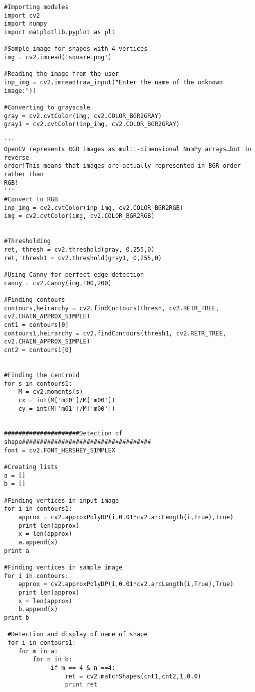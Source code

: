 \documentclass[]{article}
\begin{document}
\begin{verbatim}
#Importing modules
import cv2 
import numpy
import matplotlib.pyplot as plt

#Sample image for shapes with 4 vertices
img = cv2.imread('square.png')

#Reading the image from the user
inp_img = cv2.imread(raw_input("Enter the name of the unknown image:"))

#Converting to grayscale
gray = cv2.cvtColor(img, cv2.COLOR_BGR2GRAY)
gray1 = cv2.cvtColor(inp_img, cv2.COLOR_BGR2GRAY)

'''
OpenCV represents RGB images as multi-dimensional NumPy arrays…but in reverse
order!This means that images are actually represented in BGR order rather than
RGB!
'''
#Convert to RGB
inp_img = cv2.cvtColor(inp_img, cv2.COLOR_BGR2RGB)
img = cv2.cvtColor(img, cv2.COLOR_BGR2RGB)


#Thresholding
ret, thresh = cv2.threshold(gray, 0,255,0)
ret, thresh1 = cv2.threshold(gray1, 0,255,0)

#Using Canny for perfect edge detection
canny = cv2.Canny(img,100,200)

#Finding contours
contours,heirarchy = cv2.findContours(thresh, cv2.RETR_TREE, cv2.CHAIN_APPROX_SIMPLE)
cnt1 = contours[0]
contours1,heirarchy = cv2.findContours(thresh1, cv2.RETR_TREE, cv2.CHAIN_APPROX_SIMPLE)
cnt2 = contours1[0]


#Finding the centroid
for s in contours1:
    M = cv2.moments(s)
    cx = int(M['m10']/M['m00'])
    cy = int(M['m01']/M['m00'])


#####################Detection of shape#################################### 
font = cv2.FONT_HERSHEY_SIMPLEX

#Creating lists
a = []
b = []

#Finding vertices in input image
for i in contours1:
    approx = cv2.approxPolyDP(i,0.01*cv2.arcLength(i,True),True)
    print len(approx)
    x = len(approx)
    a.append(x)
print a    

#Finding vertices in sample image
for i in contours:
    approx = cv2.approxPolyDP(i,0.01*cv2.arcLength(i,True),True)
    print len(approx)
    x = len(approx)
    b.append(x)
print b      

 #Detection and display of name of shape
 for i in contours1:
    for m in a:
        for n in b:
             if m == 4 & n ==4:
                 ret = cv2.matchShapes(cnt1,cnt2,1,0.0)
                 print ret
            

\end{verbatim}
\end{document}
